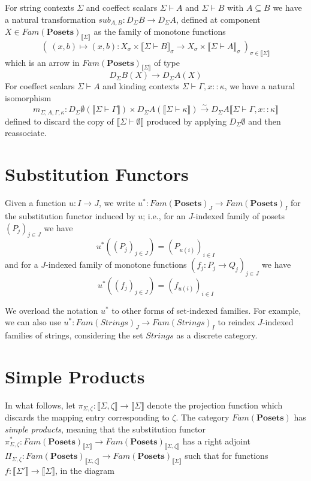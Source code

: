 \documentclass{article}
\newcommand{\mbf}{\mathbf}
\newcommand{\sem}[1]{\llbracket #1 \rrbracket}
\newcommand{\sdisp}[1]{
\left( #1 \right)
}
\begin{document}
For string contexts $\Sigma$ and coeffect scalars $\Sigma \vdash A$ and $\Sigma \vdash B$ with $A \subseteq B$ we have a natural transformation $\mathit{sub}_{A,B} : D_{\Sigma} B \to D_{\Sigma } A$, defined at component $X \in \mathit{Fam}(\mbf{Posets})_{\sem{\Sigma}}$ as the family of monotone functions $$(~(x,b) \mapsto (x,b) : X_\sigma \times \sem{\Sigma \vdash B}_\sigma \to X_{\sigma} \times \sem{\Sigma \vdash A}_{\sigma}~)_{\sigma \in \sem{\Sigma}}$$
which is an arrow in $\mathit{Fam}(\mbf{Posets})_{\sem{\Sigma}}$ of type $$D_{\Sigma}B(X) \to D_{\Sigma}A(X)$$
For coeffect scalars $\Sigma \vdash A$ and kinding contexts $\Sigma \vdash \Gamma,x :: \kappa$, we have a natural isomorphism $$m_{\Sigma,A,\Gamma,\kappa} : D_{\Sigma} \emptyset(\sem{\Sigma \vdash \Gamma}) \times D_{\Sigma} A( \sem{\Sigma \vdash \kappa} ) \overset{\sim}{\to} D_{\Sigma} A \sem{\Sigma \vdash \Gamma,x :: \kappa}$$ defined to discard the copy of $\sem{\Sigma \vdash \emptyset}$ produced by applying $D_{\Sigma} \emptyset$ and then reassociate.

\section*{Substitution Functors}

Given a function $u : I \to J$, we write $u^* : \mathit{Fam}(\mbf{Posets})_J \to \mathit{Fam}(\mbf{Posets})_I$ for the substitution functor induced by $u$; i.e., for an $J$-indexed family of posets $\sdisp{P_j}_{j \in J}$ we have $$u^* (\sdisp{P_j}_{j \in J}) = \sdisp{ P_{u(i)} }_{i \in I}$$ and for a $J$-indexed family of monotone functions $(f_j : P_j \to Q_j)_{j \in J}$ we have $$u^*(\sdisp{f_j}_{j \in J}) = \sdisp{f_{u(i)}}_{i \in I}$$

We overload the notation $u^*$ to other forms of set-indexed families. For example, we can also use $u^* : \mathit{Fam}(\mathit{Strings})_J \to \mathit{Fam}(\mathit{Strings})_I$ to reindex $J$-indexed families of strings, considering the set $\mathit{Strings}$ as a discrete category. 

\section*{Simple Products}

In what follows, let $\pi_{\Sigma,\zeta} : \sem{\Sigma,\zeta} \to \sem{\Sigma}$ denote the projection function which discards the mapping entry corresponding to $\zeta$. The category $\mathit{Fam}(\mbf{Posets})$ has \emph{simple products}, meaning that the substitution functor $\pi_{\Sigma,\zeta}^* : \mathit{Fam}(\mbf{Posets})_{\sem{\Sigma}} \to \mathit{Fam}(\mbf{Posets})_{\sem{\Sigma,\zeta}}$ has a right adjoint $\Pi_{\Sigma,\zeta} : \mathit{Fam}(\mbf{Posets})_{\sem{\Sigma,\zeta}} \to \mathit{Fam}(\mbf{Posets})_{\sem{\Sigma}}$ such that for functions $f : \sem{\Sigma'} \to \sem{\Sigma}$, in the diagram
\end{document}
